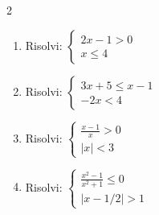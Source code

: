 \begin{multicols}{2}
\begin{enumerate}
    \item {} Risolvi: $\begin{cases} 2x-1 > 0 \\ x \le 4 \end{cases}$
    \item {} Risolvi: $\begin{cases} 3x+5 \le x-1 \\ -2x < 4 \end{cases}$
    \item {} Risolvi: $\begin{cases} \frac{x-1}{x} > 0 \\ |x| < 3 \end{cases}$
    \item {} Risolvi: $\begin{cases} \frac{x^2-1}{x^2+1} \le 0 \\ |x-1/2| > 1 \end{cases}$
\end{enumerate}
\end{multicols}

